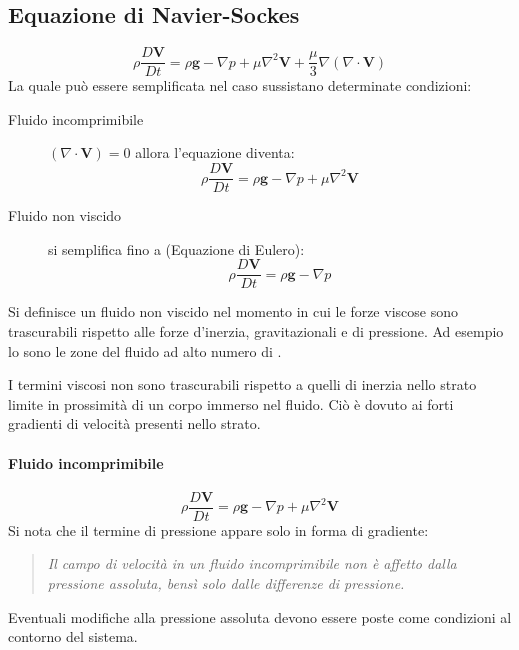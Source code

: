 \subsection{Equazione di Navier-Sockes}
\begin{equation}
\rho \frac{D\mathbf{V}}{Dt} = \rho \mathbf{g} - \nabla p + \mu \nabla^2\mathbf{V} + \frac{\mu}{3}\nabla(\nabla \cdot \mathbf{V})
\label{eqn:NavierStockes} 
\end{equation}
La quale può essere semplificata nel caso sussistano determinate condizioni:
\begin{description}
\item[Fluido incomprimibile] $(\nabla \cdot \mathbf{V}) = 0 $ allora l'equazione diventa:
\begin{equation}
\rho \frac{D\mathbf{V}}{Dt} = \rho \mathbf{g} - \nabla p + \mu \nabla^2\mathbf{V}
\end{equation}
\item[Fluido non viscido] si semplifica fino a (Equazione di Eulero):
\begin{equation}
\rho \frac{D\mathbf{V}}{Dt} = \rho \mathbf{g} - \nabla p
\label{eqn:Eulero}
\end{equation}
\end{description}
Si definisce un fluido non viscido nel momento in cui le forze viscose sono trascurabili rispetto alle forze d'inerzia, gravitazionali e di pressione.
Ad esempio lo sono le zone del fluido ad alto numero di .

I termini viscosi non sono trascurabili rispetto a quelli di inerzia nello strato limite in prossimità di un corpo immerso nel fluido. Ciò è dovuto ai forti gradienti di velocità presenti nello strato.

\paragraph{Fluido incomprimibile}
\begin{equation}
\rho \frac{D\mathbf{V}}{Dt} = \rho \mathbf{g} - \nabla p + \mu \nabla^2\mathbf{V}
\end{equation}
Si nota che il termine di pressione appare solo in forma di gradiente:
\begin{quote}
\textit{Il campo di velocità in un fluido incomprimibile non è affetto dalla pressione assoluta, bensì solo dalle differenze di pressione.}
\end{quote}
Eventuali modifiche alla pressione assoluta devono essere poste come condizioni al contorno del sistema.

